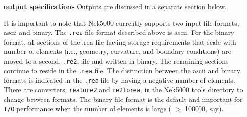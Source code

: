 \begin{description}

\item{\bf output specifications} 
     Outputs are discussed in a separate section below.
\end{description}


\noindent
It is important to note that Nek5000 currently supports two input file
formats, ascii and binary.   The {\tt .rea} file format
described above is ascii.  For the binary format, all sections
of the .rea file having storage requirements that scale with 
number of elements (i.e., geometry, curvature, and boundary 
conditions) are moved to a second, {\tt .re2}, file and
written in binary.   The remaining sections continue to 
reside in the {\tt .rea} file.   The distinction between
the ascii and binary formats is indicated in the {\tt .rea}
file by having a negative number of elements.
There are converters, {\tt reatore2} and {\tt re2torea}, in the Nek5000
tools directory to change between formats.   The binary file
format is the default and important for {\tt I/O} performance when the
number of elements is large ( \(>\) 100000, say).
